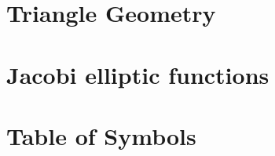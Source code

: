 \chapter{Triangle Geometry}
\label{app:app-triangle}


\chapter{Jacobi elliptic functions}
\label{app:jacobi-functions}
  

%

%  

%

\chapter{Table of Symbols}
\label{app:app-symbols}


